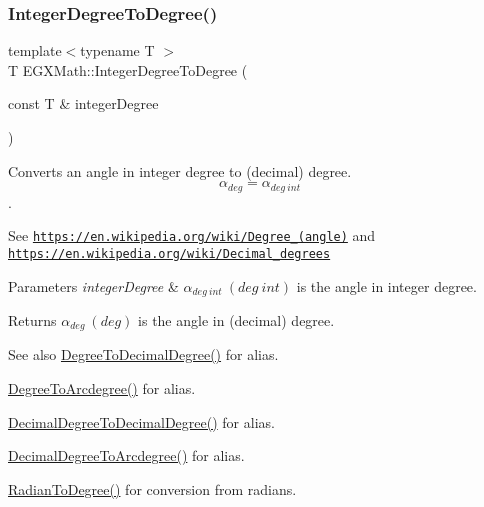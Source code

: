 \subsubsection{\texorpdfstring{Integer\+Degree\+To\+Degree()}{IntegerDegreeToDegree()}}
{\footnotesize\ttfamily template$<$typename T $>$ \\
T E\+G\+X\+Math\+::\+Integer\+Degree\+To\+Degree (\begin{DoxyParamCaption}\item[{const T \&}]{integer\+Degree }\end{DoxyParamCaption})}



Converts an angle in integer degree to (decimal) degree. \[\alpha_{deg}=\alpha_{deg\ int}\]. 

See \href{https://en.wikipedia.org/wiki/Degree_(angle)}{\tt https\+://en.\+wikipedia.\+org/wiki/\+Degree\+\_\+(angle)} and \href{https://en.wikipedia.org/wiki/Decimal_degrees}{\tt https\+://en.\+wikipedia.\+org/wiki/\+Decimal\+\_\+degrees} 
\begin{DoxyParams}{Parameters}
{\em integer\+Degree} & $\alpha_{deg\ int}\ (deg\ int)$ is the angle in integer degree. \\
\hline
\end{DoxyParams}
\begin{DoxyReturn}{Returns}
$\alpha_{deg}\ (deg)$ is the angle in (decimal) degree. 
\end{DoxyReturn}
\begin{DoxySeeAlso}{See also}
\mbox{\hyperlink{group___e_g_x_math-_angle_conversions-_degree_ga568afc1d436d425bf5d4edea584aee08}{Degree\+To\+Decimal\+Degree()}} for alias. 

\mbox{\hyperlink{group___e_g_x_math-_angle_conversions-_degree_gac1b5f3b68f66c77a6df4ceef842c9b19}{Degree\+To\+Arcdegree()}} for alias. 

\mbox{\hyperlink{group___e_g_x_math-_angle_conversions-_decimal_degree_gafccf9cd779903872887978ab9d79661f}{Decimal\+Degree\+To\+Decimal\+Degree()}} for alias. 

\mbox{\hyperlink{group___e_g_x_math-_angle_conversions-_decimal_degree_gacdd463fcabffeb598ebda65b012ce743}{Decimal\+Degree\+To\+Arcdegree()}} for alias. 

\mbox{\hyperlink{group___e_g_x_math-_angle_conversions-_radian_ga25bbce6cdc1c3621f2a158d320e3bc45}{Radian\+To\+Degree()}} for conversion from radians. 
\end{DoxySeeAlso}
\mbox{\label{group___e_g_x_math-_angle_conversions-_integer_degree_ga204317877546ea6bbafe5ff558f55a16}} 
